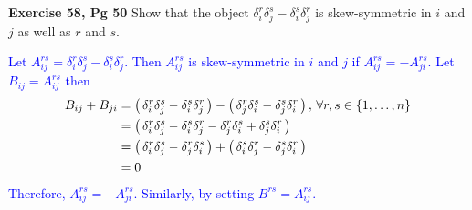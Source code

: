 \documentclass[12pt,a4paper]{report}
\newcommand{\BLUE}[1]{\textcolor{blue}{#1}}
\begin{document}
\begin{description}
	\item \textbf{Exercise 58, Pg 50} Show that the object $\delta^r_i\delta^s_j-\delta^s_i\delta^r_j$ is skew-symmetric in $i$ and $j$ as well as $r$ and $s$.
	
	\BLUE{Let $A^{rs}_{ij}=\delta^r_i\delta^s_j-\delta^s_i\delta^r_j$.  Then $A^{rs}_{ij}$ is skew-symmetric in $i$ and $j$ if $A^{rs}_{ij}=-A^{rs}_{ji}$.  Let $B_{ij} = A^{rs}_{ij}$ then
	\begin{align*}
		B_{ij}+B_{ji} &= \left (\, \delta^r_i\delta^s_j-\delta^s_i\delta^r_j \,\right )-\left (\, \delta^r_j\delta^s_i-\delta^s_j\delta^r_i \,\right ) ,\, \forall r,s \in \{1,\dots,n\} \\
		&= \left (\, \delta^r_i\delta^s_j-\delta^s_i\delta^r_j-\delta^r_j\delta^s_i+\delta^s_j\delta^r_i \,\right )\\
		&= \left (\, \delta^r_i\delta^s_j-\delta^r_j\delta^s_i \,\right ) +\left (\, \delta^s_i\delta^r_j-\delta^s_j\delta^r_i \,\right ) \\
		&= 0
\end{align*}	Therefore, $A^{rs}_{ij}= -A^{rs}_{ji}$.  Similarly, by setting $B^{rs}=A^{rs}_{ij}$.
	}
\end{description}
\end{document}
